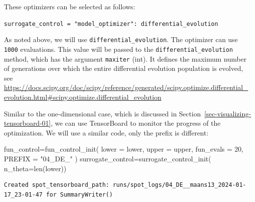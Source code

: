 \documentclass[
  letterpaper,
  DIV=11,
  numbers=noendperiod]{scrreprt}
\newenvironment{Shaded}{\begin{snugshade}}{\end{snugshade}}
\newcommand{\BuiltInTok}[1]{\textcolor[rgb]{0.00,0.23,0.31}{#1}}
\newcommand{\DecValTok}[1]{\textcolor[rgb]{0.68,0.00,0.00}{#1}}
\newcommand{\NormalTok}[1]{\textcolor[rgb]{0.00,0.23,0.31}{#1}}
\newcommand{\OperatorTok}[1]{\textcolor[rgb]{0.37,0.37,0.37}{#1}}
\newcommand{\StringTok}[1]{\textcolor[rgb]{0.13,0.47,0.30}{#1}}
\begin{document}
These optimizers can be selected as follows:

\texttt{surrogate\_control\ =\ "model\_optimizer":\ differential\_evolution}

As noted above, we will use \texttt{differential\_evolution}. The
optimizer can use \texttt{1000} evaluations. This value will be passed
to the \texttt{differential\_evolution} method, which has the argument
\texttt{maxiter} (int). It defines the maximum number of generations
over which the entire differential evolution population is evolved, see
\url{https://docs.scipy.org/doc/scipy/reference/generated/scipy.optimize.differential_evolution.html\#scipy.optimize.differential_evolution}

\begin{tcolorbox}[enhanced jigsaw, coltitle=black, bottomrule=.15mm, breakable, toprule=.15mm, colframe=quarto-callout-note-color-frame, title=\textcolor{quarto-callout-note-color}{\faInfo}\hspace{0.5em}{TensorBoard}, colbacktitle=quarto-callout-note-color!10!white, opacityback=0, left=2mm, leftrule=.75mm, colback=white, rightrule=.15mm, bottomtitle=1mm, toptitle=1mm, titlerule=0mm, arc=.35mm, opacitybacktitle=0.6]

Similar to the one-dimensional case, which is discussed in
Section~\ref{sec-visualizing-tensorboard-01}, we can use TensorBoard to
monitor the progress of the optimization. We will use a similar code,
only the prefix is different:

\begin{Shaded}
\begin{Highlighting}[]
\NormalTok{fun\_control}\OperatorTok{=}\NormalTok{fun\_control\_init(}
\NormalTok{                    lower }\OperatorTok{=}\NormalTok{ lower,}
\NormalTok{                    upper }\OperatorTok{=}\NormalTok{ upper,}
\NormalTok{                    fun\_evals }\OperatorTok{=} \DecValTok{20}\NormalTok{,}
\NormalTok{                    PREFIX }\OperatorTok{=} \StringTok{"04\_DE\_"}
\NormalTok{                    )}
\NormalTok{surrogate\_control}\OperatorTok{=}\NormalTok{surrogate\_control\_init(}
\NormalTok{                    n\_theta}\OperatorTok{=}\BuiltInTok{len}\NormalTok{(lower))}
\end{Highlighting}
\end{Shaded}

\begin{verbatim}
Created spot_tensorboard_path: runs/spot_logs/04_DE__maans13_2024-01-17_23-01-47 for SummaryWriter()
\end{verbatim}

\end{tcolorbox}
\end{document}
